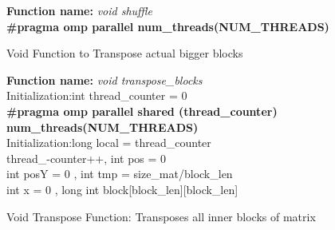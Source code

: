 \documentclass[10pt,journal]{article}
\begin{document}
\vspace{10pt}
\begin{algorithm}[H]
\SetAlgoLined
\textbf{Function name:} \emph{void shuffle}\\
\vspace{10pt} 
    \textbf{\#pragma omp parallel num\_threads(NUM\_THREADS)}

\caption{Void Function to Transpose actual bigger blocks}
\end{algorithm}

\begin{algorithm}[H]
\SetAlgoLined
\textbf{Function name:} \emph{void transpose\_blocks}\\\vspace{10pt}
Initialization\::int thread\_counter = 0\\


\vspace{10pt} 
\textbf{\#pragma omp parallel shared (thread\_counter) num\_threads(NUM\_THREADS)}\\
    Initialization\::long local = thread\_counter\\
    thread\_-counter++, int pos = 0\\
    int posY = 0 , int tmp = size\_mat/block\_len\\
    int x = 0 , long int block[block\_len][block\_len]\\
\caption{Void Transpose Function: Transposes all inner blocks of matrix}
\end{algorithm}
\end{document}
